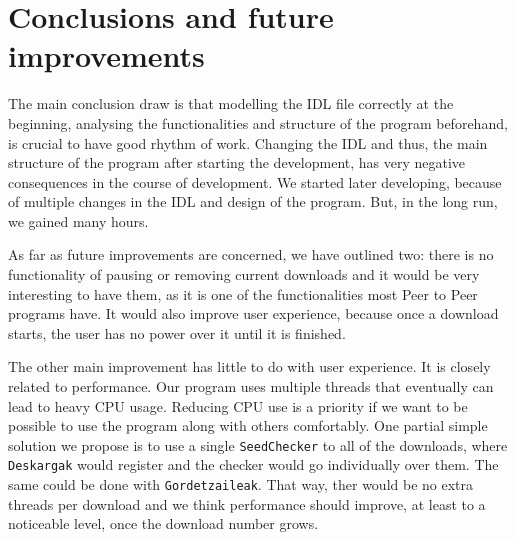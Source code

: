 \section{Conclusions and future improvements}

The main conclusion draw is that modelling the IDL file correctly at the beginning, analysing the functionalities and structure of the program beforehand, is crucial to have good rhythm of work. Changing the IDL and thus, the main structure of the program after starting the development, has very negative consequences in the course of development. We started later developing, because of multiple changes in the IDL and design of the program. But, in the long run, we gained many hours.

As far as future improvements are concerned, we have outlined two: there is no functionality of pausing or removing current downloads and it would be very interesting to have them, as it is one of the functionalities most Peer to Peer programs have. It would also improve user experience, because once a download starts, the user has no power over it until it is finished.

The other main improvement has little to do with user experience. It is closely related to performance. Our program uses multiple threads that eventually can lead to heavy CPU usage. Reducing CPU use is a priority if we want to be possible to use the program along with others comfortably. One partial simple solution we propose is to use a single \texttt{SeedChecker} to all of the downloads, where \texttt{Deskargak} would register and the checker would go individually over them. The same could be done with \texttt{Gordetzaileak}. That way, ther would be no extra threads per download and we think performance should improve, at least to a noticeable level, once the download number grows.
